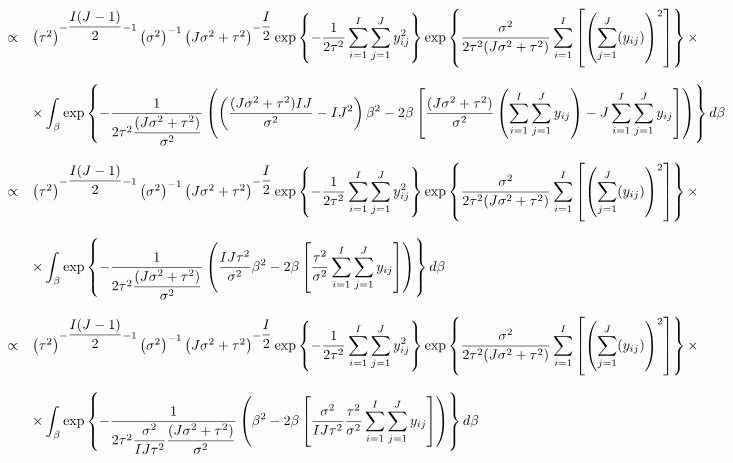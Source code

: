 \documentclass{article}
\begin{document}
\begin{equation*}
\begin{array}{lcl ll }
& \propto & \left(\tau^2\right)^{-\dfrac{I(J-1)}{2} -1} \left(\sigma^2\right)^{-1} \left(J\sigma^2 + \tau^2\right)^{-\dfrac{I}{2}} \mbox{exp}\left\{ - \dfrac{1}{2\tau^2}\displaystyle\sum_{i=1}^{I}\sum_{j=1}^{J} y_{ij}^2 \right\} \mbox{exp}\left\{ \dfrac{\sigma^2}{2\tau^2(J\sigma^2 + \tau^2)}\displaystyle\sum_{i=1}^{I}\left[\left(\sum_{j=1}^{J} (y_{ij})\right)^2 \right] \right\} \times \\ \\

& & \times
\displaystyle\int_{\beta} \mbox{exp}\left\{ - \dfrac{1}{2\tau^2\dfrac{(J\sigma^2 + \tau^2)}{\sigma^2}}\left(\left( \dfrac{(J\sigma^2 + \tau^2)IJ}{\sigma^2} - IJ^2 \right)\beta^2 - 2\beta\left[\dfrac{(J\sigma^2 + \tau^2)}{\sigma^2}\left(\displaystyle\sum_{i=1}^{I}\sum_{j=1}^{J}y_{ij} \right) - J\displaystyle\sum_{i=1}^{I}\sum_{j=1}^{J}y_{ij}\right] \right)\right\} d\beta\\\\

& \propto & \left(\tau^2\right)^{-\dfrac{I(J-1)}{2} -1} \left(\sigma^2\right)^{-1} \left(J\sigma^2 + \tau^2\right)^{-\dfrac{I}{2}} \mbox{exp}\left\{ - \dfrac{1}{2\tau^2}\displaystyle\sum_{i=1}^{I}\sum_{j=1}^{J} y_{ij}^2 \right\} \mbox{exp}\left\{ \dfrac{\sigma^2}{2\tau^2(J\sigma^2 + \tau^2)}\displaystyle\sum_{i=1}^{I}\left[\left(\sum_{j=1}^{J} (y_{ij})\right)^2 \right] \right\} \times \\ \\

& & \times
\displaystyle\int_{\beta} \mbox{exp}\left\{ - \dfrac{1}{2\tau^2\dfrac{(J\sigma^2 + \tau^2)}{\sigma^2}}\left( \dfrac{IJ\tau^2}{\sigma^2}\beta^2 - 2\beta\left[\dfrac{\tau^2}{\sigma^2}\displaystyle\sum_{i=1}^{I}\sum_{j=1}^{J}y_{ij} \right] \right)\right\} d\beta\\\\


& \propto & \left(\tau^2\right)^{-\dfrac{I(J-1)}{2} -1} \left(\sigma^2\right)^{-1} \left(J\sigma^2 + \tau^2\right)^{-\dfrac{I}{2}} \mbox{exp}\left\{ - \dfrac{1}{2\tau^2}\displaystyle\sum_{i=1}^{I}\sum_{j=1}^{J} y_{ij}^2 \right\} \mbox{exp}\left\{ \dfrac{\sigma^2}{2\tau^2(J\sigma^2 + \tau^2)}\displaystyle\sum_{i=1}^{I}\left[\left(\sum_{j=1}^{J} (y_{ij})\right)^2 \right] \right\} \times \\ \\

& & \times
\displaystyle\int_{\beta} \mbox{exp}\left\{ - \dfrac{1}{2\tau^2\dfrac{\sigma^2}{IJ\tau^2}\dfrac{(J\sigma^2 + \tau^2)}{\sigma^2}}\left(\beta^2 - 2\beta\left[\dfrac{\sigma^2}{IJ\tau^2}\dfrac{\tau^2}{\sigma^2}\displaystyle\sum_{i=1}^{I}\sum_{j=1}^{J}y_{ij} \right] \right)\right\} d\beta\\\\

 \end{array}
\end{equation*}
\end{document}
